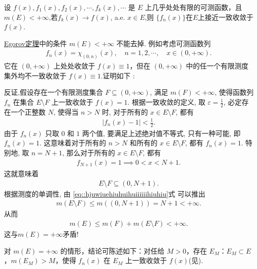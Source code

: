 \documentclass[../../main.tex]{subfiles}%
\begin{document}
\begin{theorem}\label{theorem:Egorov定理}
设 $f(x),f_1(x),f_2(x),\cdots,f_k(x),\cdots$ 是 $E$ 上几乎处处有限的可测函数，且 $m(E)<+\infty$,若$f_k(x)\to f(x)$, a.e. $x\in E$,则
$\{f_n(x)\}$在$E$上接近一致收敛于$f(x)$.
\end{theorem}
\begin{remark}
\hyperref[theorem:Egorov定理]{Egorov定理}中的条件 $m(E)<+\infty$ 不能去掉. 例如考虑可测函数列
\begin{align*}
f_n(x)=\chi_{(0,n)}(x),\quad n = 1,2,\cdots,\quad x\in(0,+\infty).
\end{align*}
它在 $(0,+\infty)$ 上处处收敛于 $f(x)\equiv1$，但在 $(0,+\infty)$ 中的任一个有限测度集外均不一致收敛于 $f(x)\equiv1$.证明如下 :

反证,假设存在一个有限测度集合 \(F \subseteq (0, +\infty)\), 满足 \(m(F) < +\infty\), 使得函数列 \(f_n\) 在集合 \(E \setminus F\) 上一致收敛于 \(f(x) = 1\). 根据一致收敛的定义, 取 \(\varepsilon = \frac{1}{2}\), 必定存在一个正整数 \(N\), 使得当 \(n > N\) 时, 对于所有的 \(x \in E \setminus F\), 都有
\begin{align*}
|f_n(x) - 1| < \frac{1}{2}.
\end{align*}
由于 \(f_n(x)\) 只取 \(0\) 和 \(1\) 两个值, 要满足上述绝对值不等式, 只有一种可能, 即 \(f_n(x) = 1\). 这意味着对于所有的 \(n > N\) 和所有的 \(x \in E \setminus F\), 都有 \(f_n(x) = 1\). 特别地, 取 \(n = N + 1\), 那么对于所有的 \(x \in E \setminus F\), 都有
\begin{align*}
f_{N+1}(x) = 1 \implies 0 < x < N+1.
\end{align*}
这就意味着
\begin{align}
E \setminus F \subseteq (0, N+1). \label{eq::hjuwiuehiuhuihuiiiiiihiuhiu}
\end{align}
根据测度的单调性, 由 \eqref{eq::hjuwiuehiuhuihuiiiiiihiuhiu}式 可以推出
\begin{align*}
m(E \setminus F) \leqslant m((0, N+1)) = N+1 < +\infty.
\end{align*}
从而
\begin{align*}
m(E) \leqslant  m(F) + m(E \setminus F)<+\infty.
\end{align*}
这与$m(E)=+\infty$矛盾! 
\end{remark}
\begin{remark}
对 $m(E)=+\infty$ 的情形，结论可陈述如下：对任给 $M>0$，存在 $E_M$：$E_M\subset E$，$m(E_M)>M$，使得 $f_n(x)$ 在 $E_M$ 上一致收敛于 $f(x)$(见).
\end{remark}
\end{document}
